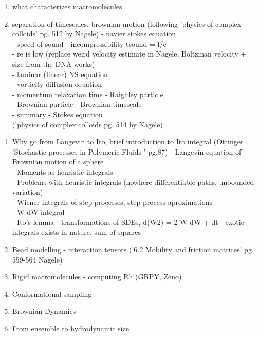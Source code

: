 \begin{enumerate}
    \item what characterizes macromolecules
    \item separation of timescales, brownian motion (following 'physics of complex colloids' pg. 512 by Nagele)
    - navier stokes equation\\
    - speed of sound - incompressibility tsound = l/c\\
    - re is low (replace weird velocity estimate in Nagele, Boltzman velocity + size from the DNA works)\\
    - laminar (linear) NS equation\\
    - vorticity diffusion equation\\
    - momentum relaxation time - Raighley particle\\
    - Brownian particle - Brownian timescale\\
    - summary - Stokes equation\\ ('physics of complex colloids pg. 514 by Nagele)
\end{enumerate}

\begin{enumerate}
    \item Why go from Langevin to Ito, brief introduction to Ito integral (Ottinger 'Stochastic processes in Polymeric Fluids ' pg.87)
    - Langevin equation of Brownian motion of a sphere\\
    - Moments as heuristic integrals\\
    - Problems with heuristic integrals (nowhere differentiable paths, unbounded variation)\\
    - Wiener integrals of step processes, step process aproximations\\
    - W dW integral\\
    - Ito's lemma - transformations of SDEs, d(W2) = 2 W dW + dt - exotic integrals exists in nature, sum of squares\\
    \item Bead modelling - interaction tensors ('6.2 Mobility and friction matrices' pg. 559-564 Nagele)
    \item Rigid macromolecules - computing Rh (GRPY, Zeno)
    \item Conformational sampling
    \item Brownian Dynamics
    \item From ensemble to hydrodynamic size
\end{enumerate}

%
%
%
